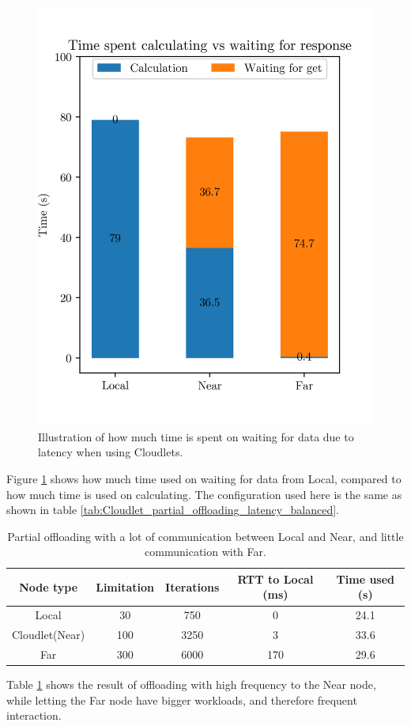 \begin{figure}[t]
    \centering
    \includegraphics[scale=1]{chapters/evaluation/figures/Cloudlet_bar_latency.png}
    \caption{Illustration of how much time is spent on waiting for data due to latency when using Cloudlets.}
    \label{fig:Cloudlet_latency_bar}
\end{figure}
Figure \ref{fig:Cloudlet_latency_bar} shows how much time used on waiting for data from Local, compared to how much time is used on calculating. The configuration used here is the same as shown in table \ref{tab:Cloudlet_partial_offloading_latency_balanced}.


\begin{table}[h!]
    \centering
    \begin{tabular}[c]{|c|c|c|c|c|}
        \hline
        Node type & Limitation & Iterations & RTT to Local (ms)& Time used (s)\\
        \hline
        \hline
        Local           & 30 & 750 & 0 & 24.1  \\
        \hline
        Cloudlet(Near)  & 100 & 3250 & 3 & 33.6 \\
        \hline
        Far             & 300 & 6000 & 170 & 29.6 \\
        \hline
    \end{tabular}
    \caption{Partial offloading with a lot of communication between Local and Near, and little communication with Far.}
    \label{tab:Cloudlet_partial_offloading_little_far}
\end{table}
Table \ref{tab:Cloudlet_partial_offloading_little_far} shows the result of offloading with high frequency to the Near node, while letting the Far node have bigger workloads, and therefore frequent interaction. 



